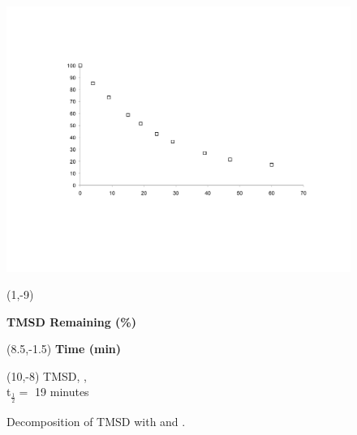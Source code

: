 \begin{figure}[t]
  \centering
  \includegraphics[scale=0.55, trim = 45mm 45mm 30mm 40mm,
clip]{chp_singlecarbon/images/decompgraph}
  \caption{Decomposition of TMSD with  and .}
  \begin{textblock}{3}(1,-9)  \begin{sideways}\small
  \textbf{\textsf{TMSD Remaining (\%)}} \end{sideways}
  \end{textblock}
\begin{textblock}{3}(8.5,-1.5)  \small \textbf{\textsf{Time (min)}}
\end{textblock}
\begin{textblock}{5}(10,-8)  \small \textsf{TMSD, ,  \\
t$_{\frac{1}{2}} = $ 19 minutes}
\end{textblock}
  \label{fig:decompgraph}
\end{figure}

